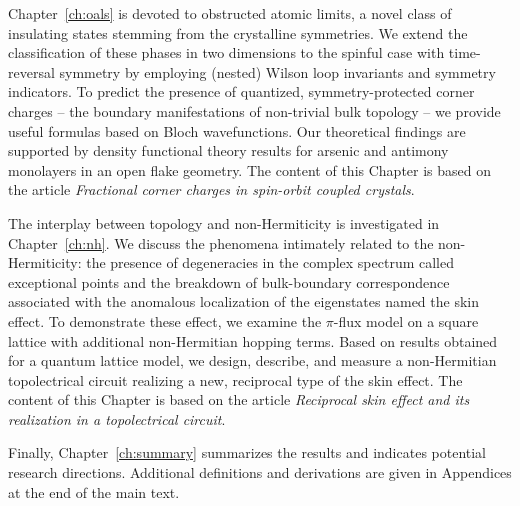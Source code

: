 \vspace{0.22cm}
\noindent Chapter~\ref{ch:oals} is devoted to obstructed atomic limits, a novel class of insulating states stemming from the crystalline symmetries. We extend the classification of these phases in two dimensions to the spinful case with time-reversal symmetry by employing (nested) Wilson loop invariants and symmetry indicators. To predict the presence of quantized, symmetry-protected corner charges -- the boundary manifestations of non-trivial bulk topology -- we provide useful formulas based on Bloch wavefunctions. Our theoretical findings are supported by density functional theory results for arsenic and antimony monolayers in an open flake geometry. The content of this Chapter is based on the article \emph{Fractional corner charges in spin-orbit coupled crystals}.

\vspace{0.22cm}
\noindent The interplay between topology and non-Hermiticity is investigated in Chapter~\ref{ch:nh}. We discuss the phenomena intimately related to the non-Hermiticity: the presence of degeneracies in the complex spectrum called exceptional points and the breakdown of bulk-boundary correspondence associated with the anomalous localization of the eigenstates named the skin effect. To demonstrate these effect, we examine the $\pi$-flux model on a square lattice with additional non-Hermitian hopping terms. Based on results obtained for a quantum lattice model, we design, describe, and measure a non-Hermitian topolectrical circuit realizing a new, reciprocal type of the skin effect. The content of this Chapter is based on the article \emph{Reciprocal skin effect and its realization in a topolectrical circuit}.

\vspace{0.22cm}
\noindent Finally, Chapter~\ref{ch:summary} summarizes the results and indicates potential research directions. Additional definitions and derivations are given in Appendices at the end of the main text.